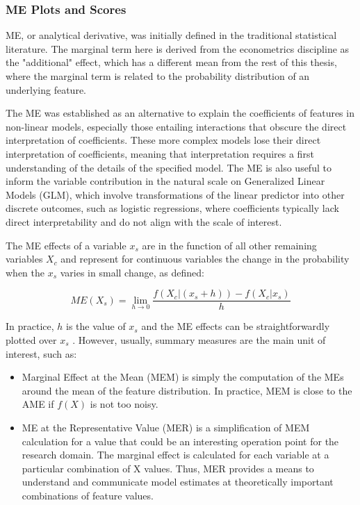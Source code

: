\subsubsection{ME Plots and Scores}

ME, or analytical derivative, was initially defined in the traditional statistical literature. The marginal term here is derived from the econometrics discipline as the "additional" effect, which has a  different mean from the rest of this thesis, where the marginal term is related to the probability distribution of an underlying feature.

The ME was established as an alternative to explain the coefficients of features in non-linear models, especially those entailing interactions that obscure the direct interpretation of coefficients. These more complex models lose their direct interpretation of coefficients, meaning that interpretation requires a first understanding of the details of the specified model\cite{Leeper2021InterpretingMargins, long1997regression}. The ME is also useful to inform the variable contribution in the natural scale on Generalized Linear Models (GLM), which involve transformations of the linear predictor into other discrete outcomes, such as logistic regressions, where coefficients typically lack direct interpretability and do not align with the scale of interest.

The ME effects of a variable $x_s$ are in the function of all other remaining variables $X_c$ and represent  for continuous variables the change in the probability when the $x_s$ varies in small change, as defined:

\begin{equation}
ME(X_s) = \lim_{{h \to 0}} \frac{{f(X_c|(x_s + h)) - f(X_c|x_s)}}{h}
\label{me}
\end{equation}

In practice, $h$ is the value of $x_s$ and the ME effects can be straightforwardly plotted over $x_s$ . However, usually, summary measures are the main unit of interest, such as:

\begin{itemize}
    \item Marginal Effect at the Mean (MEM) is simply the computation of the MEs around the mean of the feature distribution. In practice, MEM is close to the AME if \(f(X)\) is not too noisy.
\end{itemize}

\begin{itemize}
    \item ME at the Representative Value (MER) is a simpliﬁcation of MEM calculation for a value that could be an interesting operation point for the research domain. The marginal effect is calculated for each variable at a particular combination of X values. Thus, MER provides a means to understand and communicate model estimates at theoretically important combinations of feature values.
\end{itemize}

